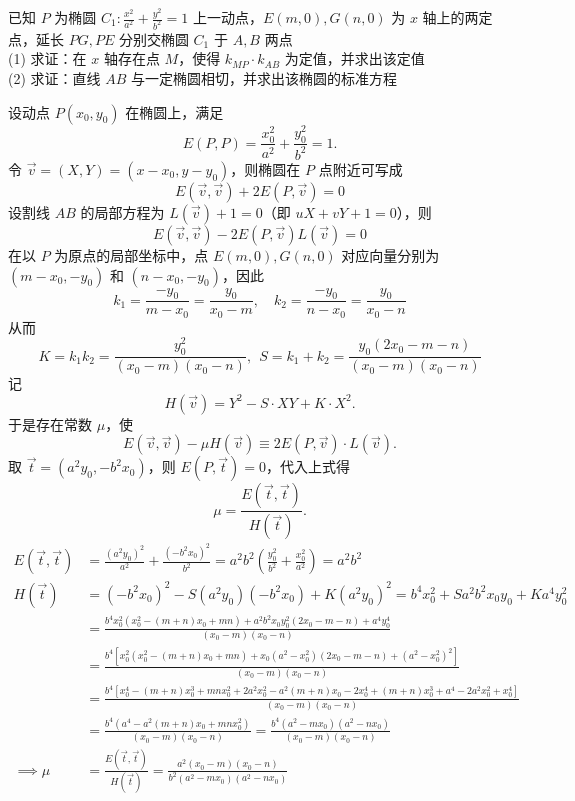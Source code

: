 \begin{exercise}
    已知 $P$ 为椭圆 $C_1: \frac{x^2}{a^2} + \frac{y^2}{b^2} = 1$ 上一动点，$E(m,0), G(n,0)$ 为 $x$ 轴上的两定点，延长 $PG, PE$ 分别交椭圆 $C_1$ 于 $A, B$ 两点\\
(1) 求证：在 $x$ 轴存在点 $M$，使得 $k_{MP} \cdot k_{AB}$ 为定值，并求出该定值\\
(2) 求证：直线 $AB$ 与一定椭圆相切，并求出该椭圆的标准方程
\end{exercise}
\begin{solution}
设动点 $P(x_0, y_0)$ 在椭圆上，满足
$$E(P,P) = \frac{x_0^2}{a^2} + \frac{y_0^2}{b^2} = 1.$$
令 $\vec{v} = (X, Y) = (x-x_0, y-y_0)$，则椭圆在 $P$ 点附近可写成
$$E(\vec{v}, \vec{v}) + 2E(P, \vec{v}) = 0$$
设割线 $AB$ 的局部方程为 $L(\vec{v}) + 1 = 0$（即 $uX+vY+1=0$），则
$$E(\vec{v}, \vec{v}) - 2E(P, \vec{v})L(\vec{v}) = 0$$
在以 $P$ 为原点的局部坐标中，点 $E(m,0), G(n,0)$ 对应向量分别为 $(m-x_0, -y_0)$ 和 $(n-x_0, -y_0)$，因此
$$k_1 = \frac{-y_0}{m-x_0} = \frac{y_0}{x_0-m}, \quad k_2 = \frac{-y_0}{n-x_0} = \frac{y_0}{x_0-n}$$
从而
$$K = k_1 k_2 = \frac{y_0^2}{(x_0-m)(x_0-n)},~~S = k_1 + k_2 = \frac{y_0(2x_0 - m - n)}{(x_0-m)(x_0-n)}$$
记
$$H(\vec{v}) = Y^2 - S \cdot XY + K \cdot X^2.$$
于是存在常数 $\mu$，使
$$E(\vec{v}, \vec{v}) - \mu H(\vec{v}) \equiv 2E(P, \vec{v}) \cdot L(\vec{v}).$$
取 $\vec{t} = (a^2 y_0, -b^2 x_0)$，则 $E(P, \vec{t}) = 0$，代入上式得
$$\mu = \frac{E(\vec{t}, \vec{t})}{H(\vec{t})}.$$
\begin{align*}
    E(\vec{t}, \vec{t}) &= \frac{(a^2 y_0)^2}{a^2} + \frac{(-b^2 x_0)^2}{b^2} = a^2 b^2 \left( \frac{y_0^2}{b^2} + \frac{x_0^2}{a^2} \right) = a^2 b^2\\
    H(\vec{t}) &= (-b^2 x_0)^2 - S(a^2 y_0)(-b^2 x_0) + K(a^2 y_0)^2 = b^4 x_0^2 + S a^2 b^2 x_0 y_0 + K a^4 y_0^2\\
    &=\frac{b^4 x_0^2(x_0^2 - (m+n)x_0 + mn) + a^2 b^2 x_0 y_0^2 (2x_0 - m - n) + a^4 y_0^4}{(x_0-m)(x_0-n)}\\
    &=\frac{b^4 \left[ x_0^2(x_0^2 - (m+n)x_0 + mn) + x_0(a^2 - x_0^2)(2x_0 - m - n) + (a^2 - x_0^2)^2 \right]}{(x_0-m)(x_0-n)}\\
    &=\frac{b^4\left[x_0^4 - (m+n)x_0^3 + mn x_0^2 + 2a^2 x_0^2 - a^2(m+n)x_0 - 2x_0^4 + (m+n)x_0^3 + a^4 - 2a^2 x_0^2 + x_0^4\right]}{(x_0-m)(x_0-n)}\\
    &=\frac{b^4(a^4 - a^2(m+n)x_0 + mn x_0^2)}{(x_0-m)(x_0-n)}=\frac{b^4(a^2-mx_0)(a^2-nx_0)}{(x_0-m)(x_0-n)}\\
\implies \mu &= \frac{E(\vec{t}, \vec{t})}{H(\vec{t})} = \frac{a^2(x_0-m)(x_0-n)}{b^2(a^2-mx_0)(a^2-nx_0)}

\end{align*}
\end{solution}
